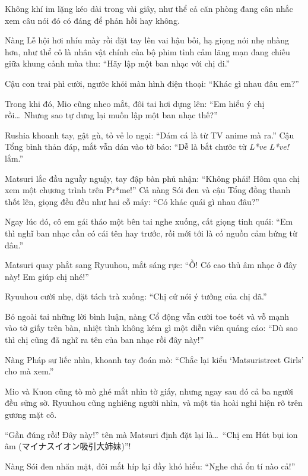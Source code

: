 \documentclass[../main.tex]{subfiles}
\begin{document}
Không khí im lặng kéo dài trong vài giây, như thể cả căn phòng đang cân nhắc xem câu nói đó có đáng để phản hồi hay không.


Nàng Lễ hội hơi nhíu mày rồi đặt tay lên vai hậu bối, hạ giọng nói nhẹ nhàng hơn, như thể cô là nhân vật chính của bộ phim tình cảm lãng mạn đang chiếu giữa khung cảnh mùa thu: ``Hãy lập một ban nhạc với chị đi.''


Cậu con trai phì cười, ngước khỏi màn hình điện thoại: ``Khác gì nhau đâu em?''

Trong khi đó, Mio cũng nheo mắt, đôi tai hơi dựng lên: ``Em hiểu ý chị rồi\dots\ Nhưng sao tự dưng lại muốn lập một ban nhạc thế?''

Rushia khoanh tay, gật gù, tỏ vẻ lo ngại: ``Dám cá là từ TV anime mà ra.'' Cậu Tổng bình thản đáp, mắt vẫn dán vào tờ báo: ``Dễ là bắt chước từ \emph{L*ve L*ve!} lắm.''

Matsuri lắc đầu nguầy nguậy, tay đập bàn phủ nhận: ``Không phải! Hôm qua chị xem một chương trình trên Pr*me!'' Cả nàng Sói đen và cậu Tổng đồng thanh thốt lên, giọng đều đều như hai cỗ máy: ``Có khác quái gì nhau đâu?''

Ngay lúc đó, cô em gái tháo một bên tai nghe xuống, cất giọng tinh quái: ``Em thì nghĩ ban nhạc cần có cái tên hay trước, rồi mới tới là có nguồn cảm hứng từ đâu.''

Matsuri quay phắt sang Ryuuhou, mắt sáng rực: ``Ồ! Có cao thủ âm nhạc ở đây này! Em giúp chị nhé!''

Ryuuhou cười nhẹ, đặt tách trà xuống: ``Chị cứ nói ý tưởng của chị đã.''

Bỏ ngoài tai những lời bình luận, nàng Cổ động vẫn cười toe toét và vỗ mạnh vào tờ giấy trên bàn, nhiệt tình không kém gì một diễn viên quảng cáo: ``Dù sao thì chị cũng đã nghĩ ra tên của ban nhạc rồi đây này!''

Nàng Pháp sư liếc nhìn, khoanh tay đoán mò: ``Chắc lại kiểu `Matsuristreet Girls' cho mà xem.''

Mio và Kuon cũng tò mò ghé mắt nhìn tờ giấy, nhưng ngay sau đó cả ba người đều sững sờ. Ryuuhou cũng nghiêng người nhìn, và một tia hoài nghi hiện rõ trên gương mặt cô.


``Gần đúng rồi! Đây này!'' tên mà Matsuri định đặt lại là\dots\ ``Chị em Hút bụi ion âm (マイナスイオン吸引大姉妹)''!

Nàng Sói đen nhăn mặt, đôi mắt híp lại đầy khó hiểu: ``Nghe chả ổn tí nào cả!''
\end{document}
